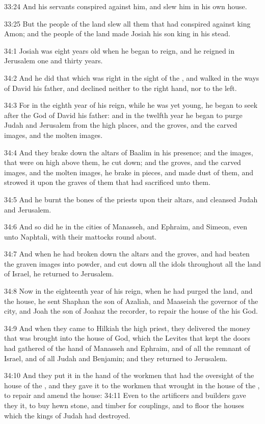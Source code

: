 33:24 And his servants conspired against him, and slew him in his own
house.

33:25 But the people of the land slew all them that had conspired
against king Amon; and the people of the land made Josiah his son king
in his stead.

34:1 Josiah was eight years old when he began to reign, and he reigned
in Jerusalem one and thirty years.

34:2 And he did that which was right in the sight of the \LORD, and
walked in the ways of David his father, and declined neither to the
right hand, nor to the left.

34:3 For in the eighth year of his reign, while he was yet young, he
began to seek after the God of David his father: and in the twelfth
year he began to purge Judah and Jerusalem from the high places, and
the groves, and the carved images, and the molten images.

34:4 And they brake down the altars of Baalim in his presence; and the
images, that were on high above them, he cut down; and the groves, and
the carved images, and the molten images, he brake in pieces, and made
dust of them, and strowed it upon the graves of them that had
sacrificed unto them.

34:5 And he burnt the bones of the priests upon their altars, and
cleansed Judah and Jerusalem.

34:6 And so did he in the cities of Manasseh, and Ephraim, and Simeon,
even unto Naphtali, with their mattocks round about.

34:7 And when he had broken down the altars and the groves, and had
beaten the graven images into powder, and cut down all the idols
throughout all the land of Israel, he returned to Jerusalem.

34:8 Now in the eighteenth year of his reign, when he had purged the
land, and the house, he sent Shaphan the son of Azaliah, and Maaseiah
the governor of the city, and Joah the son of Joahaz the recorder, to
repair the house of the \LORD his God.

34:9 And when they came to Hilkiah the high priest, they delivered the
money that was brought into the house of God, which the Levites that
kept the doors had gathered of the hand of Manasseh and Ephraim, and
of all the remnant of Israel, and of all Judah and Benjamin; and they
returned to Jerusalem.

34:10 And they put it in the hand of the workmen that had the
oversight of the house of the \LORD, and they gave it to the workmen
that wrought in the house of the \LORD, to repair and amend the house:
34:11 Even to the artificers and builders gave they it, to buy hewn
stone, and timber for couplings, and to floor the houses which the
kings of Judah had destroyed.

